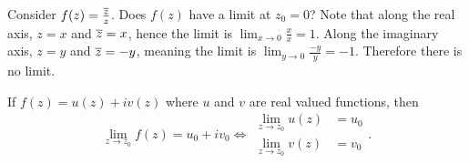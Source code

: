 \documentclass[../notes.tex]{subfiles}
\begin{document}
\begin{example}
    Consider $f(z) = \frac{\overline{z}}{z}$. Does $f(z)$ have a limit at $z_0 = 0$? Note that along the real axis, $z = x$ and $\overline{z} = x$, hence the limit is $\lim_{x\to 0}\frac{x}{x} = 1$. Along the imaginary axis, $z = y$ and $\overline{z} = -y$, meaning the limit is $\lim_{y\to 0} \frac{-y}{y} = -1$. Therefore there is no limit.
\end{example}

\begin{theorem}
    \label{thm:limitequivalence}
    If $f(z) = u(z) + iv(z)$ where $u$ and $v$ are real valued functions, then
    \[
        \renewcommand{\arraystretch}{1.5}
        \lim_{z \to z_0} f(z) = u_0 + iv_0 \Longleftrightarrow \begin{array}{rl}
            \displaystyle
            \lim_{z\to z_0} u(z) &= u_0 \\
            \displaystyle
            \lim_{z\to z_0} v(z) &= v_0
        \end{array}
    .\]
\end{theorem}
\end{document}
